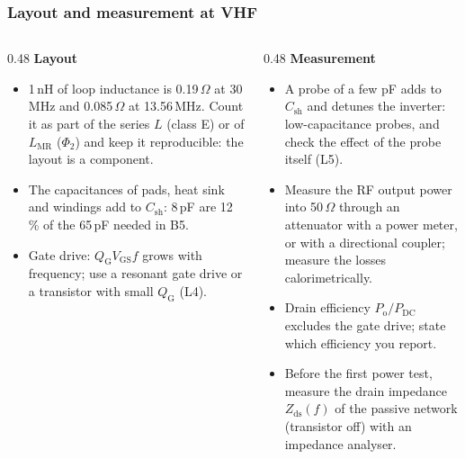 \begin{frame}
	\frametitle{Layout and measurement at VHF}
	\begin{columns}[T]
		\begin{column}{0.48\textwidth}
			\footnotesize
			\textbf{Layout}
			\begin{itemize}
				\item 1\,nH of loop inductance is 0.19\,$\Omega$ at 30\,MHz and 0.085\,$\Omega$ at 13.56\,MHz. Count it as part of the series $L$ (class E) or of $L_\mathrm{MR}$ ($\Phi_2$) and keep it reproducible: the layout is a component.
				\item The capacitances of pads, heat sink and windings add to $C_\mathrm{sh}$: 8\,pF are 12\,\% of the 65\,pF needed in B5.
				\item Gate drive: $Q_\mathrm{G}V_\mathrm{GS}f$ grows with frequency; use a resonant gate drive or a transistor with small $Q_\mathrm{G}$ (L4).
			\end{itemize}
		\end{column}
		\begin{column}{0.48\textwidth}
			\footnotesize
			\textbf{Measurement}
			\begin{itemize}
				\item A probe of a few pF adds to $C_\mathrm{sh}$ and detunes the inverter: low-capacitance probes, and check the effect of the probe itself (L5).
				\item Measure the RF output power into 50\,$\Omega$ through an attenuator with a power meter, or with a directional coupler; measure the losses calorimetrically.
				\item Drain efficiency $P_\mathrm{o}/P_\mathrm{DC}$ excludes the gate drive; state which efficiency you report.
				\item Before the first power test, measure the drain impedance $Z_\mathrm{ds}(f)$ of the passive network (transistor off) with an impedance analyser.
			\end{itemize}
		\end{column}
	\end{columns}
\end{frame}

